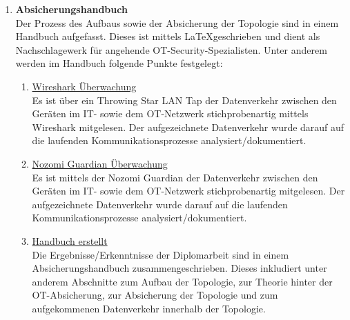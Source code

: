 \documentclass[
	headings=optiontotocandhead,%
	oneside,
	numbers=noenddot,%
	toc=flat, %
	10pt, %
	parskip=full, %
	listof=totoc, %
	listof=flat, %
	numbers=noenddot, %
	bibliography=totoc, %
	a4paper,DIV=14,
]{scrartcl}
\begin{document}
\begin{enumerate}[start=1,label={\bfseries Ziel-H \arabic*},leftmargin=*,wide]
\item{\bfseries{Absicherungshandbuch}}\\
Der Prozess des Aufbaus sowie der Absicherung der Topologie sind in einem Handbuch aufgefasst. Dieses ist mittels \LaTeX geschrieben und dient als Nachschlagewerk für angehende OT-Security-Spezialisten. Unter anderem werden im Handbuch folgende Punkte festgelegt:
\begin{enumerate}[label=\alph*.]
\item{\underline{Wireshark Überwachung}}\\
Es ist über ein Throwing Star LAN Tap der Datenverkehr zwischen den Geräten im IT- sowie dem OT-Netzwerk stichprobenartig mittels Wireshark mitgelesen. Der aufgezeichnete Datenverkehr wurde darauf auf die laufenden Kommunikationsprozesse analysiert/dokumentiert.

\item{\underline{Nozomi Guardian Überwachung}}\\
Es ist mittels der Nozomi Guardian der Datenverkehr zwischen den Geräten im IT- sowie dem OT-Netzwerk stichprobenartig mitgelesen. Der aufgezeichnete Datenverkehr wurde darauf auf die laufenden Kommunikationsprozesse analysiert/dokumentiert.

\item{\underline{Handbuch erstellt}}\\
Die Ergebnisse/Erkenntnisse der Diplomarbeit sind in einem Absicherungshandbuch zusammengeschrieben. Dieses inkludiert unter anderem Abschnitte zum Aufbau der Topologie, zur Theorie hinter der OT-Absicherung, zur Absicherung der Topologie und zum aufgekommenen Datenverkehr innerhalb der Topologie.
\end{enumerate}
\end{enumerate}
\end{document}
